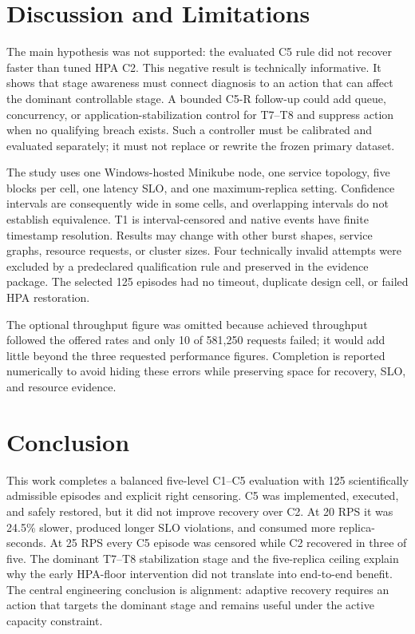 \documentclass[10pt,twocolumn]{article}
\begin{document}
\section{Discussion and Limitations}
The main hypothesis was not supported: the evaluated C5 rule did not recover faster than tuned HPA C2. This negative result is technically informative. It shows that stage awareness must connect diagnosis to an action that can affect the dominant controllable stage. A bounded C5-R follow-up could add queue, concurrency, or application-stabilization control for T7--T8 and suppress action when no qualifying breach exists. Such a controller must be calibrated and evaluated separately; it must not replace or rewrite the frozen primary dataset.

The study uses one Windows-hosted Minikube node, one service topology, five blocks per cell, one latency SLO, and one maximum-replica setting. Confidence intervals are consequently wide in some cells, and overlapping intervals do not establish equivalence. T1 is interval-censored and native events have finite timestamp resolution. Results may change with other burst shapes, service graphs, resource requests, or cluster sizes. Four technically invalid attempts were excluded by a predeclared qualification rule and preserved in the evidence package. The selected 125 episodes had no timeout, duplicate design cell, or failed HPA restoration.

The optional throughput figure was omitted because achieved throughput followed the offered rates and only 10 of 581,250 requests failed; it would add little beyond the three requested performance figures. Completion is reported numerically to avoid hiding these errors while preserving space for recovery, SLO, and resource evidence.

\clearpage
\section{Conclusion}
This work completes a balanced five-level C1--C5 evaluation with 125 scientifically admissible episodes and explicit right censoring. C5 was implemented, executed, and safely restored, but it did not improve recovery over C2. At 20 RPS it was 24.5\% slower, produced longer SLO violations, and consumed more replica-seconds. At 25 RPS every C5 episode was censored while C2 recovered in three of five. The dominant T7--T8 stabilization stage and the five-replica ceiling explain why the early HPA-floor intervention did not translate into end-to-end benefit. The central engineering conclusion is alignment: adaptive recovery requires an action that targets the dominant stage and remains useful under the active capacity constraint.
\end{document}
